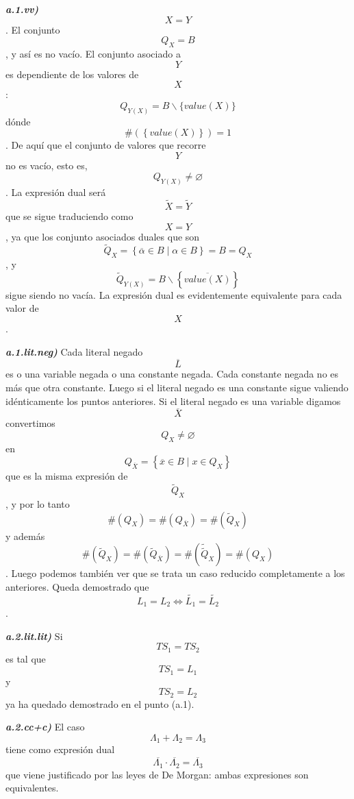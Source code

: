 \documentclass[
]{article}
\begin{document}
\begin{enumerate}
\begin{enumerate}
\begin{enumerate}
\begin{enumerate}
\begin{enumerate}
          \emph{\textbf{a.1.vv)}} \[X = Y\]. El conjunto \[Q_{X} = B\] ,
          y así es no vacío. El conjunto asociado a \[Y\] es dependiente
          de los valores de \[X\]:
          \[Q_{Y{(X)}} = {B \smallsetminus {\{{\mathit{value}{(X)}}\}}}\]dónde
          \[\#{\left( \left\{ {\mathit{value}{(X)}} \right\} \right) = 1}\].
          De aquí que el con\-junto de valores que recorre \[Y\]no es
          vacío, esto es, \[Q_{Y{(X)}} \neq \varnothing\]. La
          ex\-presión dual será \[\widetilde{X} = \widetilde{Y}\] que se
          sigue traduciendo como \[X = Y\], ya que los conjunto
          asociados duales que son
          \[{{{\widetilde{Q}}_{X} = \left\{ {{\overline{\alpha} \in B} \mid {\alpha \in B}} \right\}} = B} = Q_{X}\],
          y
          \[{\widetilde{Q}}_{Y{(X)}} = {B \smallsetminus \left\{ \overline{\mathit{value}{(X)}} \right\}}\]sigue
          siendo no vacía. La expresión dual es evi\-dentemente
          equivalente para cada valor de \[X\].

          \emph{\textbf{a.1.lit.neg)}} Cada literal negado
          \[\overline{L}\] es o una variable negada o una cons\-tante
          negada. Cada constante negada no es más que otra constante.
          Luego si el literal negado es una constante sigue valiendo
          idénticamente los puntos anteriores. Si el literal negado es
          una variable digamos \[\overline{X}\] convertimos
          \[Q_{X} \neq \varnothing\] en
          \[Q_{\overline{X}} = \left\{ {{\overline{x} \in B} \mid {x \in Q_{X}}} \right\}\]
          que es la misma expresión de \[{\widetilde{Q}}_{X}\], y por lo
          tanto
          \[\#{{(Q_{X})} = \#}{{(Q_{\overline{X}})} = \#}{({\widetilde{Q}}_{X})}\]y
          además
          \[\#{{({\widetilde{Q}}_{X})} = \#}{{({\widetilde{Q}}_{\overline{X}})} = \#}{{({\widetilde{\widetilde{Q}}}_{X})} = \#}{(Q_{X})}\].
          Luego podemos también ver que se trata un caso reducido
          completamente a los anteriores. Queda demostrado que
          \[{L_{1} = L_{2}}\Leftrightarrow{\widetilde{L_{1}} = \widetilde{L_{2}}}\]
          .

          \emph{\textbf{a.2.lit.lit)}} Si
          \[\mathit{TS}_{1} = \mathit{TS}_{2}\] es tal que
          \[\mathit{TS}_{1} = L_{1}\] y \[\mathit{TS}_{2} = L_{2}\] ya
          ha queda\-do demostrado en el punto (a.1).

          \emph{\textbf{a.2.cc+c)}} El caso
          \[{\Lambda_{1} + \Lambda_{2}} = \Lambda_{3}\] tiene como
          expresión dual
          \[{\overline{\Lambda_{1}} \cdot \overline{\Lambda_{2}}} = \overline{\Lambda_{3}}\]que
          viene justificado por las leyes de De Morgan: ambas
          expresiones son equivalentes.


\end{enumerate}
\end{enumerate}
\end{enumerate}
\end{enumerate}
\end{enumerate}
\end{document}
